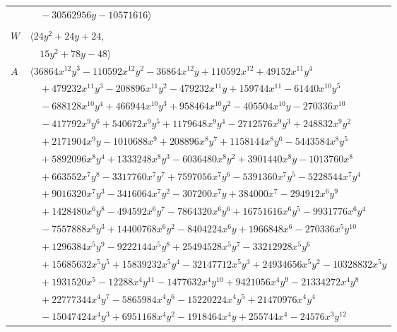 \documentclass[11pt]{article}
\begin{document}
\begin{longtable}{@{}ll@{}}
 & $\quad -30562956y-10571616\rangle$\\
\addlinespace[2pt]
\multicolumn{2}{@{}p{0.97\textwidth}@{}}{$i=46$, $D_i=16$, $\rho_{ij}$: $1{:}1, \allowbreak 2{:}1, \allowbreak 3{:}1, \allowbreak 8{:}2, \allowbreak 17{:}2, \allowbreak 30{:}2, \allowbreak 31{:}1, \allowbreak 33{:}2, \allowbreak 35{:}1, \allowbreak 41{:}2, \allowbreak 43{:}2$}\\
$W$ & $\langle 24y^{2}+24y+24,$\\
 & $\quad 15y^{2}+78y-48\rangle$\\
$A$ & $\langle 36864x^{12}y^{3}-110592x^{12}y^{2}-36864x^{12}y+110592x^{12}+49152x^{11}y^{4}$\\
 & $\quad +479232x^{11}y^{3}-208896x^{11}y^{2}-479232x^{11}y+159744x^{11}-61440x^{10}y^{5}$\\
 & $\quad -688128x^{10}y^{4}+466944x^{10}y^{3}+958464x^{10}y^{2}-405504x^{10}y-270336x^{10}$\\
 & $\quad -417792x^{9}y^{6}+540672x^{9}y^{5}+1179648x^{9}y^{4}-2712576x^{9}y^{3}+248832x^{9}y^{2}$\\
 & $\quad +2171904x^{9}y-1010688x^{9}+208896x^{8}y^{7}+1158144x^{8}y^{6}-5443584x^{8}y^{5}$\\
 & $\quad +5892096x^{8}y^{4}+1333248x^{8}y^{3}-6036480x^{8}y^{2}+3901440x^{8}y-1013760x^{8}$\\
 & $\quad +663552x^{7}y^{8}-3317760x^{7}y^{7}+7597056x^{7}y^{6}-5391360x^{7}y^{5}-5228544x^{7}y^{4}$\\
 & $\quad +9016320x^{7}y^{3}-3416064x^{7}y^{2}-307200x^{7}y+384000x^{7}-294912x^{6}y^{9}$\\
 & $\quad +1428480x^{6}y^{8}-494592x^{6}y^{7}-7864320x^{6}y^{6}+16751616x^{6}y^{5}-9931776x^{6}y^{4}$\\
 & $\quad -7557888x^{6}y^{3}+14400768x^{6}y^{2}-8404224x^{6}y+1966848x^{6}-270336x^{5}y^{10}$\\
 & $\quad +1296384x^{5}y^{9}-9222144x^{5}y^{8}+25494528x^{5}y^{7}-33212928x^{5}y^{6}$\\
 & $\quad +15685632x^{5}y^{5}+15839232x^{5}y^{4}-32147712x^{5}y^{3}+24934656x^{5}y^{2}-10328832x^{5}y$\\
 & $\quad +1931520x^{5}-12288x^{4}y^{11}-1477632x^{4}y^{10}+9421056x^{4}y^{9}-21334272x^{4}y^{8}$\\
 & $\quad +22777344x^{4}y^{7}-5865984x^{4}y^{6}-15220224x^{4}y^{5}+21470976x^{4}y^{4}$\\
 & $\quad -15047424x^{4}y^{3}+6951168x^{4}y^{2}-1918464x^{4}y+255744x^{4}-24576x^{3}y^{12}$\\

\end{longtable}
\end{document}
